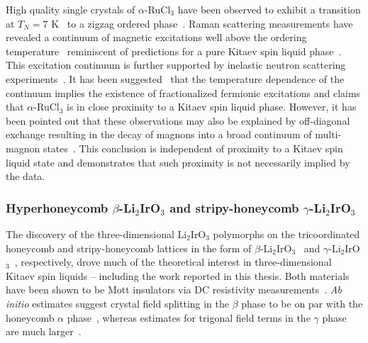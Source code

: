 High quality single crystals of $\alpha$-RuCl$_3$ have been observed to exhibit a transition at $T_N = 7$ K~\cite{BanerjeeScience2017} to a zigzag ordered phase~\cite{JohnsonPRB2015,SearsPRB2015,BanerjeeNatMat2016}.
Raman scattering measurements have revealed a continuum of magnetic excitations well above the ordering temperature~\cite{SandilandsPRL2015} reminiscent of predictions for a pure Kitaev spin liquid phase~\cite{KnollePRL2014}.
This excitation continuum is further supported by inelastic neutron scattering experiments~\cite{BanerjeeScience2017,RanPRL2017}.
It has been suggested~\cite{NasuNatPhys2016} that the temperature dependence of the continuum implies the existence of fractionalized fermionic excitations and claims that $\alpha$-RuCl$_3$ is in close proximity to a Kitaev spin liquid phase.
However, it has been pointed out that these observations may also be explained by off-diagonal exchange resulting in the decay of magnons into a broad continuum of multi-magnon states~\cite{WinterNatComm2017}.
This conclusion is independent of proximity to a Kitaev spin liquid state and demonstrates that such proximity is not necessarily implied by the data.


%
%
\subsubsection{Hyperhoneycomb $\beta$-Li$_2$IrO$_3$ and stripy-honeycomb $\gamma$-Li$_2$IrO$_3$}
%
%
The discovery of the three-dimensional Li$_2$IrO$_3$ polymorphs on the tricoordinated honeycomb and stripy-honeycomb lattices in the form of $\beta$-Li$_2$IrO$_3$~\cite{TakayamaPRL2015} and $\gamma$-Li$_2$IrO$_3$~\cite{ModicNatComm2014}, respectively, drove much of the theoretical interest in three-dimensional Kitaev spin liquids -- including the work reported in this thesis.
Both materials have been shown to be Mott insulators via DC resistivity measurements~\cite{ModicNatComm2014,TakayamaPRL2015}.
\textit{Ab initio} estimates suggest crystal field splitting in the $\beta$ phase to be on par with the honeycomb $\alpha$ phase~\cite{KatukuriSP2016,KimEPL2015}, whereas estimates for trigonal field terms in the $\gamma$ phase are much larger~\cite{WinterJOP2017}.

